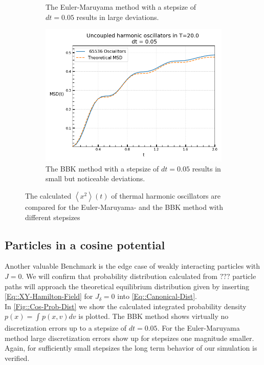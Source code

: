 \begin{figure}[htp]
\begin{subfigure}{0.5\textwidth}
			\caption{The Euler-Maruyama method with a stepsize of $dt=0.05$ results in large deviations.}
		\end{subfigure}
		\begin{subfigure}{0.5\textwidth}
			\centering
			\includegraphics[width=0.8\linewidth]{graphics/MSD-BBK-0.05.png}
			\caption{The BBK method with a stepsize of $dt=0.05$ results in small but noticeable deviations.}
		\end{subfigure}
		\caption{The calculated $\left \langle x^2 \right \rangle (t)$ of thermal harmonic oscillators are compared for the Euler-Maruyama- and the BBK method with different stepsizes}
		\label{Fig::MSD-Comparison}
	\end{figure}
	
	\subsection{Particles in a cosine potential}
	Another valuable Benchmark is the edge case of weakly interacting particles with $J=0$. We will confirm that probability distribution calculated from  $???$ particle paths will approach the theoretical equilibrium distribution given by inserting \autoref{Eq::XY-Hamilton-Field} for $J_\delta =	0$ into \autoref{Eq::Canonical-Dist}. \\
	
	In \autoref{Fig::Cos-Prob-Dist} we show the calculated integrated probability density $p(x) =	\int_{}^{} p(x, v) dv$ is plotted. The BBK method shows virtually no discretization errors up to a stepsize of $dt =	0.05$. For the Euler-Maruyama method large discretization errors show up for stepsizes one magnitude smaller. \\
	
	Again, for sufficiently small stepsizes the long term behavior of our simulation is  verified.
	
